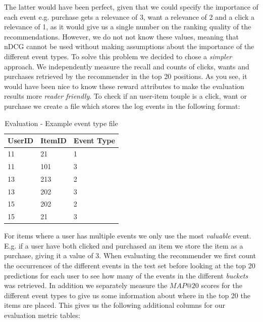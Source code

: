 The latter would have been perfect, given that we could specify the importance of each event e.g. purchase gets a relevance of 3, want
a relevance of 2 and a click a relevance of 1, as it would give us a single number on the ranking quality of the recommendations.
However, we do not not know these values, meaning that nDCG cannot be used without making assumptions about the importance of the different
event types. To solve this problem we decided to chose a \emph{simpler} approach. We independently measure the recall
and counts of clicks, wants and purchases retrieved by the recommender in the top 20 positions. As you see, it would have been nice to know these
reward attributes to make the evaluation results more \emph{reader friendly}. To check if an user-item touple is a click, want or purchase we create
a file which stores the log events in the following format:


\begin{table}[H]
\centering
\begin{tabular}{*{3}l}
\toprule
UserID	&	ItemID	 &  Event Type  \\ \midrule
11		&	21		 &	1			\\
11		&	101		 &	3			\\
13		&	213		 &	2			\\
13		&	202		 &  3			\\
15		&	202		 &  2			\\
15		&	21		 &  3			\\
\bottomrule
\end{tabular}
\caption{Evaluation - Example event type file}
\label{table:event-type}
\end{table}

For items where a user has multiple events we only use the most \emph{valuable} event. E.g. if a user have both clicked
and purchased an item we store the item as a purchase, giving it a value of 3. When evaluating the recommender we first count the
occurrences of the different events in the test set before looking at the top 20 predictions for each user to see how many of the events in the
different \emph{buckets} was retrieved. In addition we separately measure the $MAP@20$ scores for the different event types to give us some information
about where in the top 20 the items are placed. This gives us the following additional columns for our evaluation metric tables:

